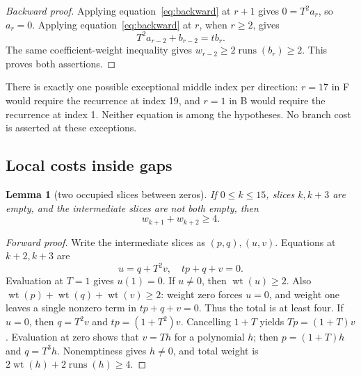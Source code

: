 \documentclass{article}
\newtheorem{lemma}{Lemma}
\DeclareMathOperator{\wt}{wt}
\DeclareMathOperator{\runs}{runs}
\begin{document}
\begin{proof}[Backward proof]
  Applying equation~\eqref{eq:backward} at \(r + 1\) gives \(0 = T^2 a_r\),
  so \(a_r = 0\). Applying equation~\eqref{eq:backward} at \(r\), when \(r \ge 2\), gives
  \begin{equation}
    T^2 a_{r-2} + b_{r-2} = t b_r.
  \end{equation}
  The same coefficient-weight inequality gives \(w_{r-2} \ge 2 \runs(b_r) \ge 2\).
  This proves both assertions.
\end{proof}

There is exactly one possible exceptional middle index per direction:
\(r = 17\) in F would require the recurrence at index 19, and \(r = 1\) in B would require
the recurrence at index 1. Neither equation is among the hypotheses. No branch cost is
asserted at these exceptions.

\subsection{Local costs inside gaps}\label{sec:gaps}

\begin{lemma}[two occupied slices between zeros]\label{lem:gap-three}
  If \(0 \le k \le 15\), slices
  \(k, k + 3\) are empty, and the intermediate slices are not both empty, then
  \begin{equation}
    w_{k+1} + w_{k+2} \ge 4.
  \end{equation}
\end{lemma}

\begin{proof}[Forward proof]  Write the intermediate slices as \((p,q), (u,v)\).
  Equations at \(k + 2, k + 3\) are
  \begin{equation}
    u = q + T^2 v, \quad tp + q + v = 0.
  \end{equation}
  Evaluation at \(T = 1\) gives \(u(1) = 0\). If \(u \ne 0\), then \(\wt(u) \ge 2\).
  Also \(\wt(p) + \wt(q) + \wt(v) \ge 2\): weight zero forces \(u = 0\), and weight one
  leaves a single nonzero term in \(tp + q + v = 0\). Thus the total is at least four.
  If \(u = 0\), then \(q = T^2 v\) and \(tp = (1 + T^2) v\). Cancelling \(1 + T\) yields
  \(Tp = (1 + T) v\). Evaluation at zero shows that \(v = Th\) for a polynomial \(h\);
  then \(p = (1 + T) h\) and \(q = T^3 h\). Nonemptiness gives \(h \ne 0\), and total weight
  is \(2 \wt(h) + 2 \runs(h) \ge 4\).
\end{proof}
\end{document}
